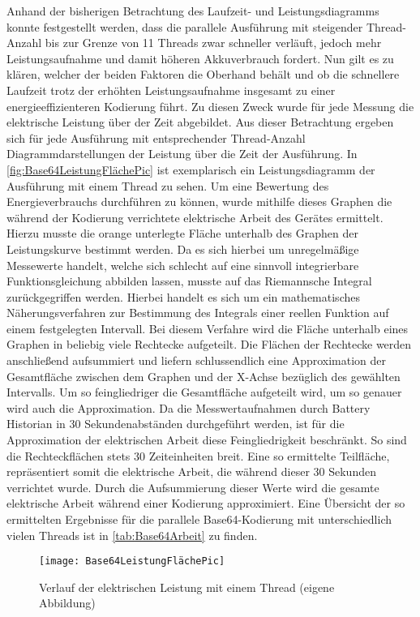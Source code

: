 Anhand der bisherigen Betrachtung des Laufzeit- und Leistungsdiagramms konnte festgestellt werden, dass die parallele Ausführung mit steigender Thread-Anzahl bis zur Grenze von 11 Threads zwar schneller verläuft, jedoch mehr Leistungsaufnahme und damit höheren Akkuverbrauch fordert. Nun gilt es zu klären, welcher der beiden Faktoren die Oberhand behält und ob die schnellere Laufzeit trotz der erhöhten Leistungsaufnahme insgesamt zu einer energieeffizienteren Kodierung führt. Zu diesen Zweck wurde für jede Messung die elektrische Leistung über der Zeit abgebildet. Aus dieser Betrachtung ergeben sich für jede Ausführung mit entsprechender Thread-Anzahl Diagrammdarstellungen der Leistung über die Zeit der Ausführung.  In \autoref{fig:Base64LeistungFlächePic} ist exemplarisch ein Leistungsdiagramm der Ausführung mit einem Thread zu sehen. Um eine Bewertung des Energieverbrauchs durchführen zu können, wurde mithilfe dieses Graphen die während der Kodierung verrichtete elektrische Arbeit des Gerätes ermittelt. Hierzu musste die orange unterlegte Fläche unterhalb des Graphen der Leistungskurve bestimmt werden. Da es sich hierbei um unregelmäßige Messewerte handelt, welche sich schlecht auf eine sinnvoll integrierbare Funktionsgleichung abbilden lassen, musste auf das Riemannsche Integral zurückgegriffen werden. Hierbei handelt es sich um ein mathematisches Näherungsverfahren zur Bestimmung des Integrals einer reellen Funktion auf einem festgelegten Intervall. Bei diesem Verfahre wird die Fläche unterhalb eines Graphen in beliebig viele Rechtecke aufgeteilt. Die Flächen der Rechtecke werden anschließend aufsummiert und liefern schlussendlich eine Approximation der Gesamtfläche  zwischen dem Graphen und der X-Achse bezüglich des gewählten Intervalls. Um so feingliedriger die Gesamtfläche aufgeteilt wird, um so genauer wird auch die Approximation. Da die Messwertaufnahmen durch Battery Historian in 30 Sekundenabständen durchgeführt werden, ist für die Approximation der elektrischen Arbeit diese Feingliedrigkeit beschränkt. So sind die Rechteckflächen stets 30 Zeiteinheiten breit. Eine so ermittelte Teilfläche, repräsentiert somit die elektrische Arbeit, die während dieser 30 Sekunden verrichtet wurde. Durch die Aufsummierung dieser Werte wird die gesamte elektrische Arbeit während einer Kodierung approximiert. Eine Übersicht der so ermittelten Ergebnisse  für die parallele Base64-Kodierung mit unterschiedlich vielen Threads ist in \autoref{tab:Base64Arbeit} zu finden.

\begin{figure}[H]
	\begin{center}	 
	\texttt{[image: Base64LeistungFlächePic]}
	\caption{Verlauf der elektrischen Leistung mit einem Thread (eigene Abbildung)}
	\label{fig:Base64LeistungFlächePic} 
	\end{center}
\end{figure}


